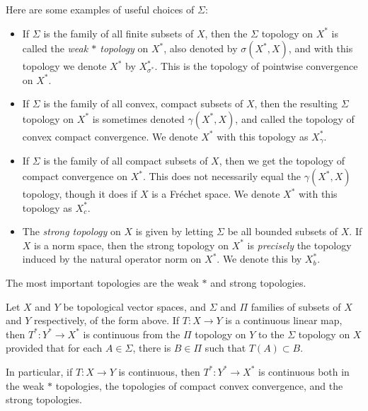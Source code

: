 Here are some examples of useful choices of $\Sigma$:
%
\begin{itemize}
    \item If $\Sigma$ is the family of all finite subsets of $X$, then the $\Sigma$ topology on $X^*$ is called the \emph{weak $*$ topology} on $X^*$, also denoted by $\sigma(X^*,X)$, and with this topology we denote $X^*$ by $X^*_{\sigma^*}$. This is the topology of pointwise convergence on $X^*$.

    \item If $\Sigma$ is the family of all convex, compact subsets of $X$, then the resulting $\Sigma$ topology on $X^*$ is sometimes denoted $\gamma(X^*,X)$, and called the topology of convex compact convergence. We denote $X^*$ with this topology as $X^*_\gamma$.

    \item If $\Sigma$ is the family of all compact subsets of $X$, then we get the topology of compact convergence on $X^*$. This does not necessarily equal the $\gamma(X^*,X)$ topology, though it does if $X$ is a Fr\'{e}chet space. We denote $X^*$ with this topology as $X^*_c$.

    \item The \emph{strong topology} on $X$ is given by letting $\Sigma$ be all bounded subsets of $X$. If $X$ is a norm space, then the strong topology on $X^*$ is \emph{precisely} the topology induced by the natural operator norm on $X^*$. We denote this by $X^*_b$.
\end{itemize}
%
The most important topologies are the weak $*$ and strong topologies.

\begin{theorem}
    Let $X$ and $Y$ be topological vector spaces, and $\Sigma$ and $\Pi$ families of subsets of $X$ and $Y$ respectively, of the form above. If $T: X \to Y$ is a continuous linear map, then $T^*: Y^* \to X^*$ is continuous from the $\Pi$ topology on $Y$ to the $\Sigma$ topology on $X$ provided that for each $A \in \Sigma$, there is $B \in \Pi$ such that $T(A) \subset B$.
\end{theorem}

In particular, if $T: X \to Y$ is continuous, then $T^*: Y^* \to X^*$ is continuous both in the weak $*$ topologies, the topologies of compact convex convergence, and the strong topologies.

